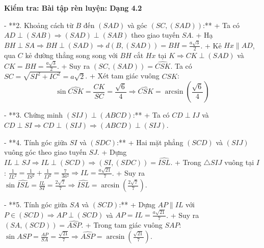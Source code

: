 \documentclass[12pt,a4paper]{article}
\newenvironment{quiz}[1]{
	\noindent\textbf{\Large Kiểm tra: #1}
}{}
\begin{document}
\begin{quiz}{Bài tập rèn luyện: Dạng 4.2}
{- **2. Khoảng cách từ $B$ đến $(SAD)$ và góc $(SC, (SAD))$:**
  + Ta có $AD \perp (SAB) \Rightarrow (SAD) \perp (SAB)$ theo giao tuyến $SA$.
  + Hạ $BH \perp SA \Rightarrow BH \perp (SAD) \Rightarrow d(B, (SAD)) = BH = \frac{a\sqrt{3}}{2}$.
  + Kẻ $Hx \parallel AD$, qua $C$ kẻ đường thẳng song song với $BH$ cắt $Hx$ tại $K \Rightarrow CK \perp (SAD)$ và $CK = BH = \frac{a\sqrt{3}}{2}$.
  + Suy ra $(SC, (SAD)) = \widehat{CSK}$. Ta có $SC = \sqrt{SI^2 + IC^2} = a\sqrt{2}$.
  + Xét tam giác vuông $CSK$:
    $$\sin \widehat{CSK} = \frac{CK}{SC} = \frac{\sqrt{6}}{4} \Rightarrow \widehat{CSK} = \arcsin\left(\frac{\sqrt{6}}{4}\right)$$

- **3. Chứng minh $(SIJ) \perp (ABCD)$:**
  + Ta có $CD \perp IJ$ và $CD \perp SI \Rightarrow CD \perp (SIJ) \Rightarrow (ABCD) \perp (SIJ)$.

- **4. Tính góc giữa $SI$ và $(SDC)$:**
  + Hai mặt phẳng $(SCD)$ và $(SIJ)$ vuông góc theo giao tuyến $SJ$.
  + Dựng $IL \perp SJ \Rightarrow IL \perp (SCD) \Rightarrow (SI, (SDC)) = \widehat{ISL}$.
  + Trong $\triangle SIJ$ vuông tại $I$: $\frac{1}{IL^2} = \frac{1}{IS^2} + \frac{1}{IJ^2} = \frac{7}{3a^2} \Rightarrow IL = \frac{a\sqrt{21}}{7}$.
  + Suy ra $\sin \widehat{ISL} = \frac{IL}{SI} = \frac{2\sqrt{7}}{7} \Rightarrow \widehat{ISL} = \arcsin\left(\frac{2\sqrt{7}}{7}\right)$.

- **5. Tính góc giữa $SA$ và $(SCD)$:**
  + Dựng $AP \parallel IL$ với $P \in (SCD) \Rightarrow AP \perp (SCD)$ và $AP = IL = \frac{a\sqrt{21}}{7}$.
  + Suy ra $(SA, (SCD)) = \widehat{ASP}$.
  + Trong tam giác vuông $SAP$: $\sin \widehat{ASP} = \frac{AP}{SA} = \frac{\sqrt{21}}{7} \Rightarrow \widehat{ASP} = \arcsin\left(\frac{\sqrt{21}}{7}\right)$.}

\end{quiz}

\end{document}
